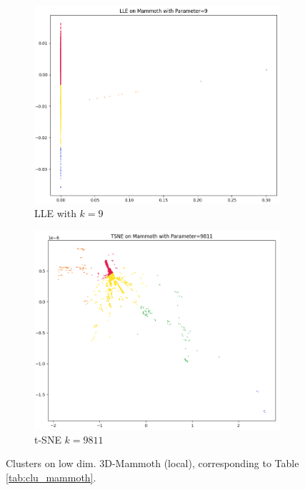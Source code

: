 \begin{figure}[!]
\begin{subfigure}[t]{0.49\columnwidth}
    \end{subfigure}
    \hfill
     \begin{subfigure}[t]{0.49\columnwidth}
    	\centering
    	\includegraphics[width=\columnwidth]{images/KMEANS_5_LLE_9.png}
    	\caption{LLE with $k=9$}
        \label{fig:KMEANS_5_LLE_9}
    \end{subfigure}
     \hfill
     \begin{subfigure}[t]{0.49\columnwidth}
    	\centering
    	\includegraphics[width=\columnwidth]{images/KMEANS_5_TSNE_9811.png}
    	\caption{t-SNE $k=9811$}
        \label{fig:KMEANS_5_TSNE_9811}
    \end{subfigure}
     \caption[Clusters on low dim. 3D-Mammoth (local)]{Clusters on low dim. 3D-Mammoth (local), corresponding to Table \ref{tab:clu_mammoth}.}
    \label{fig:local_clu_mammoth}
\end{figure}


